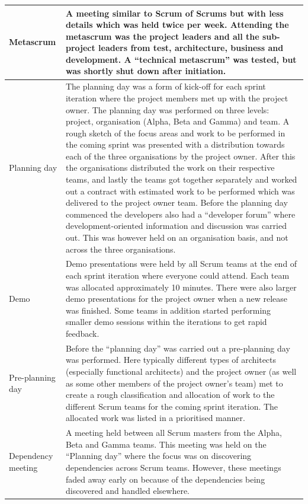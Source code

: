 \begin{center}
\begin{longtable}{| p{6cm} | p{9cm} |}
    Metascrum & A meeting similar to Scrum of Scrums but with less details which was held twice per week. Attending the metascrum was the project leaders and all the sub-project leaders from test, architecture, business and development. A ``technical metascrum'' was tested, but was shortly shut down after initiation. \\ \hline
    Planning day & The planning day was a form of kick-off for each sprint iteration where the project members met up with the project owner. The planning day was performed on three levels: project, organisation (Alpha, Beta and Gamma) and team. A rough sketch of the focus areas and work to be performed in the coming sprint was presented with a distribution towards each of the three organisations by the project owner. After this the organisations distributed the work on their respective teams, and lastly the teams got together separately and worked out a contract with estimated work to be performed which was delivered to the project owner team. Before the planning day commenced the developers also had a ``developer forum'' where development-oriented information and discussion was carried out. This was however held on an organisation basis, and not across the three organisations. \\ \hline
    Demo & Demo presentations were held by all Scrum teams at the end of each sprint iteration where everyone could attend. Each team was allocated approximately 10 minutes. There were also larger demo presentations for the project owner when a new release was finished. Some teams in addition started performing smaller demo sessions within the iterations to get rapid feedback. \\ \hline
    Pre-planning day & Before the ``planning day'' was carried out a pre-planning day was performed. Here typically different types of architects (especially functional architects) and the project owner (as well as some other members of the project owner's team) met to create a rough classification and allocation of work to the different Scrum teams for the coming sprint iteration. The allocated work was listed in a prioritised manner. \\ \hline
    Dependency meeting & A meeting held between all Scrum masters from the Alpha, Beta and Gamma teams. This meeting was held on the ``Planning day'' where the focus was on discovering dependencies across Scrum teams. However, these meetings faded away early on because of the dependencies being discovered and handled elsewhere. \\ \hline

\end{longtable}
\end{center}
